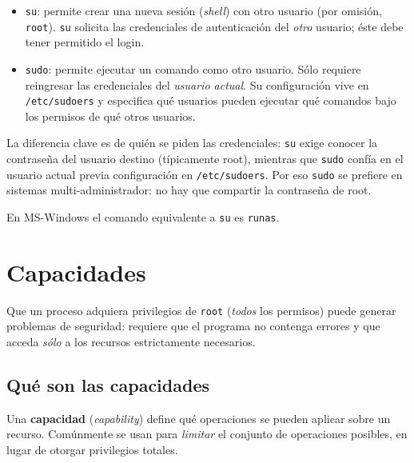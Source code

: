 \documentclass[11pt,a4paper]{article}
\begin{document}
\begin{itemize}[leftmargin=*]
    \item \texttt{su}: permite crear una nueva sesión (\emph{shell})
        con otro usuario (por omisión, \texttt{root}). \texttt{su}
        solicita las credenciales de autenticación del \emph{otro}
        usuario; éste debe tener permitido el login.
    \item \texttt{sudo}: permite ejecutar un comando como otro
        usuario. Sólo requiere reingresar las credenciales del
        \emph{usuario actual}. Su configuración vive en
        \verb|/etc/sudoers| y especifica qué usuarios pueden ejecutar
        qué comandos bajo los permisos de qué otros usuarios.
\end{itemize}

\begin{idea}
La diferencia clave es de quién se piden las credenciales: \texttt{su}
exige conocer la contraseña del usuario destino (típicamente root),
mientras que \texttt{sudo} confía en el usuario actual previa
configuración en \verb|/etc/sudoers|. Por eso \texttt{sudo} se
prefiere en sistemas multi-administrador: no hay que compartir la
contraseña de root.
\end{idea}

En MS-Windows el comando equivalente a \texttt{su} es \texttt{runas}.

\section{Capacidades}

Que un proceso adquiera privilegios de \texttt{root} (\emph{todos} los
permisos) puede generar problemas de seguridad: requiere que el
programa no contenga errores y que acceda \emph{sólo} a los recursos
estrictamente necesarios.

\subsection{Qué son las capacidades}

\begin{definicion}
Una \textbf{capacidad} (\emph{capability}) define qué operaciones se
pueden aplicar sobre un recurso. Comúnmente se usan para
\emph{limitar} el conjunto de operaciones posibles, en lugar de
otorgar privilegios totales.
\end{definicion}
\end{document}
